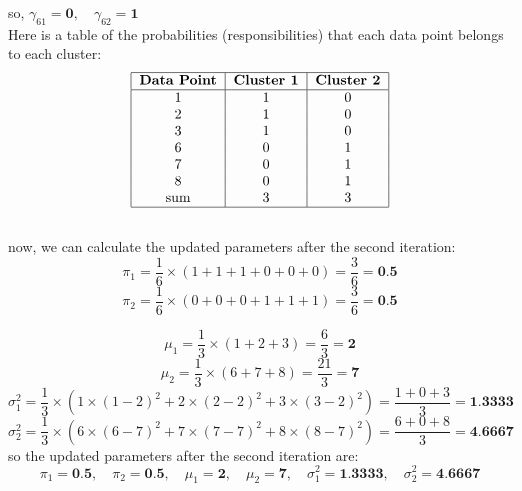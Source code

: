 \documentclass{article}
\begin{document}
\begin{enumerate}
\[\]
so, $\gamma_{61} = \textbf{0}, \quad \gamma_{62} = \textbf{1}$
\\ Here is a table of the probabilities (responsibilities) that each data point belongs to each cluster:
\[
\begin{tabular}{|c|c|c|c|c|c|c|c|}
\hline
\textbf{Data Point} & \textbf{Cluster 1} & \textbf{Cluster 2} \\
\hline
1 & 1 & 0 \\
2 & 1 & 0 \\
3 & 1 & 0 \\
6 & 0 & 1 \\
7 & 0 & 1 \\
8 & 0 & 1 \\
sum & 3 & 3 \\
\hline
\end{tabular}
\]
\\ now, we can calculate the updated parameters after the second iteration:
\[
\pi_1 = \frac{1}{6} \times (1 + 1 + 1 + 0 + 0 + 0) = \frac{3}{6} = \textbf{0.5}
\]
\[
\pi_2 = \frac{1}{6} \times (0 + 0 + 0 + 1 + 1 + 1) = \frac{3}{6} = \textbf{0.5}
\]

\[
\mu_1 = \frac{1}{3} \times (1 + 2 + 3) = \frac{6}{3} = \textbf{2}
\]
\[
\mu_2 = \frac{1}{3} \times (6 + 7 + 8) = \frac{21}{3} = \textbf{7}
\]
\[
\sigma_1^2 = \frac{1}{3} \times (1 \times (1 - 2)^2 + 2 \times (2 - 2)^2 + 3 \times (3 - 2)^2) = \frac{1 + 0 + 3}{3} = \textbf{1.3333}
\]
\[
\sigma_2^2 = \frac{1}{3} \times (6 \times (6 - 7)^2 + 7 \times (7 - 7)^2 + 8 \times (8 - 7)^2) = \frac{6 + 0 + 8}{3} = \textbf{4.6667}
\]
so the updated parameters after the second iteration are:
\[
\pi_1 = \textbf{0.5}, \quad \pi_2 = \textbf{0.5}, \quad \mu_1 = \textbf{2}, \quad \mu_2 = \textbf{7}, \quad \sigma_1^2 = \textbf{1.3333}, \quad \sigma_2^2 = \textbf{4.6667}
\]



\end{enumerate}
\end{document}
